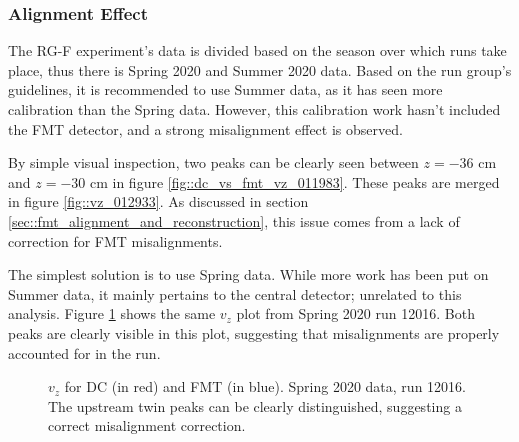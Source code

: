 \subsubsection{Alignment Effect}
\label{sssec::alignment_effect}
    The RG-F experiment's data is divided based on the season over which runs take place, thus there is Spring 2020 and Summer 2020 data.
    Based on the run group's guidelines, it is recommended to use Summer data, as it has seen more calibration than the Spring data.
    However, this calibration work hasn't included the FMT detector, and a strong misalignment effect is observed.

    By simple visual inspection, two peaks can be clearly seen between $z = -36$ cm and $z = -30$ cm in figure \ref{fig::dc_vs_fmt_vz_011983}.
    These peaks are merged in figure \ref{fig::vz_012933}.
    As discussed in section \ref{sec::fmt_alignment_and_reconstruction}, this issue comes from a lack of correction for FMT misalignments.

    The simplest solution is to use Spring data.
    While more work has been put on Summer data, it mainly pertains to the central detector; unrelated to this analysis.
    Figure \ref{fig::vz_012016} shows the same $v_z$ plot from Spring 2020 run 12016.
    Both peaks are clearly visible in this plot, suggesting that misalignments are properly accounted for in the run.

    \begin{figure}[t!]
        \centering{}
        \caption[$v_z$ for DC and FMT, run 12016]{$v_z$ for DC (in red) and FMT (in blue). Spring 2020 data, run 12016. The upstream twin peaks can be clearly distinguished, suggesting a correct misalignment correction.}
        \label{fig::vz_012016}
    \end{figure}
